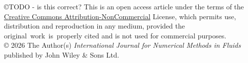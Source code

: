 \documentclass[ASNA,twocolumn]{USG} %
\begin{document}
{    %
    }



    \copyright{TODO - is this correct? This is an open access article under the terms of the \href{Creative Commons Attribution-NonCommercial}{Creative Commons Attribution-NonCommercial} License, which permits use, distribution and reproduction in any medium, provided the
    original~work~is~properly cited and is not used for commercial purposes.
    \\[5pt]
      ©  2026 The Author(s) \textit{International Journal for Numerical Methods in Fluids} published by John Wiley \& Sons Ltd.} %
    
\end{document}
